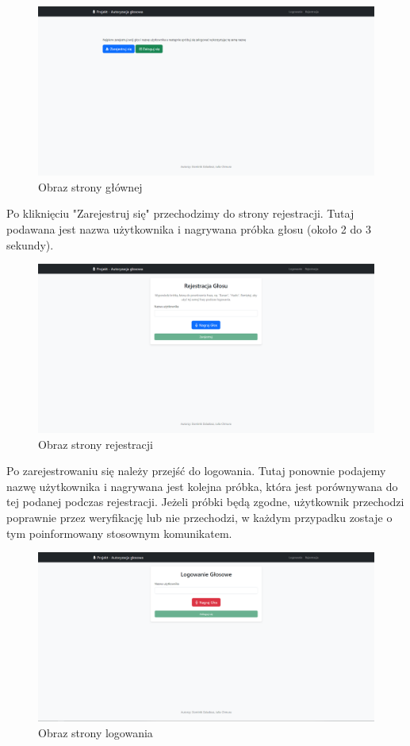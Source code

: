\begin{figure}[H]
	\centering
	\includegraphics[width=\linewidth]{src/images/strona_glowna.png}
	\caption{Obraz strony głównej}
\end{figure}

Po kliknięciu "Zarejestruj się" przechodzimy do strony rejestracji. Tutaj podawana jest nazwa użytkownika i nagrywana próbka głosu (około 2 do 3 sekundy). 

\begin{figure}[H]
	\centering
	\includegraphics[width=\linewidth]{src/images/nagranie_probki_glosu.png}
	\caption{Obraz strony rejestracji}
\end{figure}

Po zarejestrowaniu się należy przejść do logowania. Tutaj ponownie podajemy nazwę użytkownika i nagrywana jest kolejna próbka, która jest porównywana do tej podanej podczas rejestracji. Jeżeli próbki będą zgodne, użytkownik przechodzi poprawnie przez weryfikację lub nie przechodzi, w każdym przypadku zostaje o tym poinformowany stosownym komunikatem. 

\begin{figure}[H]
	\centering
	\includegraphics[width=\linewidth]{src/images/weryfikacja_probki_glosu.png}
	\caption{Obraz strony logowania}
\end{figure}


